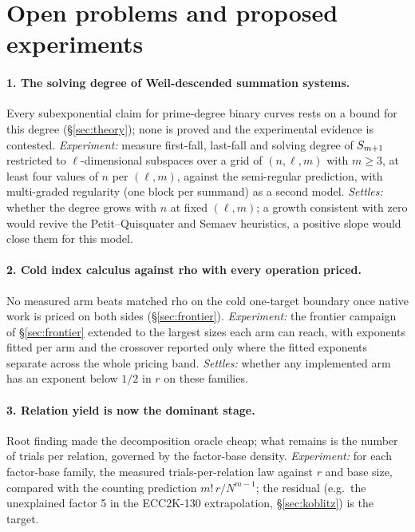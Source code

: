 \section{Open problems and proposed experiments}\label{sec:open}


\paragraph{1. The solving degree of Weil-descended summation systems.}
Every subexponential claim for prime-degree binary curves rests on a bound
for this degree (\S\ref{sec:theory}); none is proved and the experimental
evidence is contested. \emph{Experiment:} measure first-fall, last-fall
and solving degree of $S_{m+1}$ restricted to $\ell$-dimensional
subspaces over a grid of $(n,\ell,m)$ with $m\ge3$, at least four values
of $n$ per $(\ell,m)$, against the semi-regular prediction, with
multi-graded regularity (one block per summand) as a second model.
\emph{Settles:} whether the degree grows with $n$ at fixed $(\ell,m)$; a
growth consistent with zero would revive the Petit--Quisquater and Semaev
heuristics, a positive slope would close them for this model.

\paragraph{2. Cold index calculus against rho with every operation
priced.} No measured arm beats matched rho on the cold one-target boundary
once native work is priced on both sides (\S\ref{sec:frontier}).
\emph{Experiment:} the frontier campaign of \S\ref{sec:frontier} extended
to the largest sizes each arm can reach, with exponents fitted per arm and
the crossover reported only where the fitted exponents separate across the
whole pricing band. \emph{Settles:} whether any implemented arm has an
exponent below $1/2$ in $r$ on these families.

\paragraph{3. Relation yield is now the dominant stage.} Root finding made
the decomposition oracle cheap; what remains is the number of trials per
relation, governed by the factor-base density. \emph{Experiment:} for each
factor-base family, the measured trials-per-relation law against $r$ and
base size, compared with the counting prediction $m!\,r/N^{m-1}$; the
residual (e.g.\ the unexplained factor 5 in the ECC2K-130 extrapolation,
\S\ref{sec:koblitz}) is the target.


